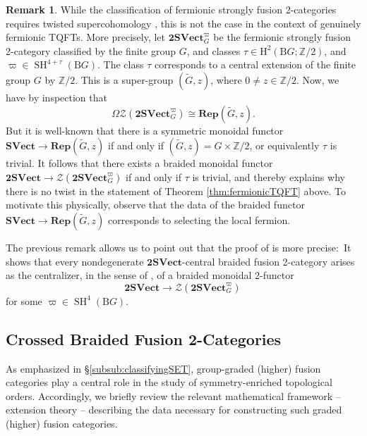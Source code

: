 \documentclass[11pt,reqno]{amsart}
\DeclareMathOperator{\SH}{SH}
\newcommand{\SVect}{\mathbf{SVect}}
\newcommand{\tSVect}{\mathbf{2SVect}}
\newcommand{\cZ}{\mathcal{Z}}
\newcommand{\rH}{\mathrm{H}}
\newcommand{\rB}{\mathrm{B}}
\numberwithin{equation}{section}
\theoremstyle{plain}
\theoremstyle{definition}
\newtheorem{rem}[equation]{Remark}
\begin{document}
\begin{rem}\label{rem:loopscenter}
    While the classification of fermionic strongly fusion 2-categories requires twisted supercohomology \cite{Decoppet:2024htz}, this is not the case in the context of genuinely fermionic TQFTs. More precisely, let $\tSVect^\varpi_G$ be the fermionic strongly fusion 2-category classified by the finite group $G$, and classes $\tau\in\rH^2(\rB G;\mathbb{Z}/2)$, and $\varpi\in \SH^{4+\tau}(\rB G)$. The class $\tau$ corresponds to a central extension of the finite group $G$ by $\mathbb{Z}/2$. This is a super-group $(\widetilde{G},z)$, where $0\neq z\in\mathbb{Z}/2$. Now, we have by inspection that $$\Omega\cZ(\tSVect^\varpi_G)\cong \mathbf{Rep}(\widetilde{G},z).$$
    But it is well-known that there is a symmetric monoidal functor $\SVect\rightarrow \mathbf{Rep}(\widetilde{G},z)$ if and only if $(\widetilde{G},z) = G\times\mathbb{Z}/2$, or equivalently $\tau$ is trivial. It follows that there exists a braided monoidal functor $\tSVect\rightarrow \cZ(\tSVect^\varpi_G)$ if and only if $\tau$ is trivial, and thereby explains why there is no twist in the statement of Theorem \ref{thm:fermionicTQFT} above. To motivate this physically, observe that the data of the braided functor $\SVect\rightarrow \mathbf{Rep}(\widetilde{G},z)$ corresponds to selecting the local fermion.
\end{rem}

The previous remark  allows us to point out that the proof of \cite[Corollary V.4]{JF} is more precise:\ It shows that every nondegenerate $\mathbf{2SVect}$-central braided fusion 2-category arises as the centralizer, in the sense of \cite[Definition 4.1.1]{xu2024higher}, of a braided monoidal 2-functor
$$\tSVect\rightarrow \cZ(\tSVect^\varpi_G)\,$$
for some $\varpi \in \SH^4(\rB G)$.


\subsection{Crossed Braided Fusion 2-Categories}\label{subsection:extensions}

As emphasized in \S\ref{subsub:classifyingSET}, group-graded (higher) fusion categories play a central role in the study of symmetry-enriched topological orders. Accordingly, we briefly review the relevant mathematical framework -- extension theory -- describing the data necessary for constructing such graded (higher) fusion categories.
\end{document}
